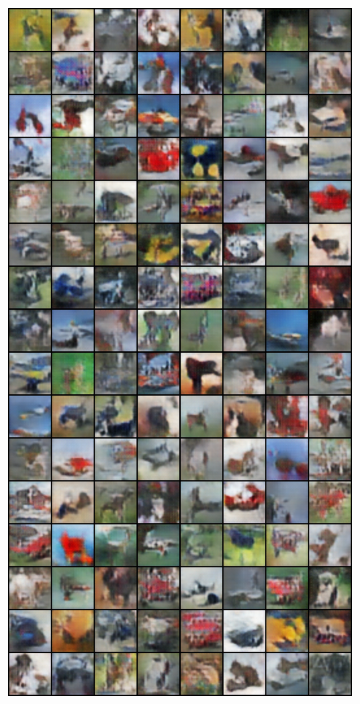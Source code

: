 \begin{figure}[H]
    \begin{subfigure}{0.2\textwidth}
        \centering
        \includegraphics[width=0.95\linewidth]{cifar10/64/fake_sample_epoch_0015.png}
        \caption{}
        \label{subfig:cifar10/64/fake_sample_epoch_0015}
    \end{subfigure}%
    \begin{subfigure}{0.2\textwidth}

\end{subfigure}
\end{figure}
